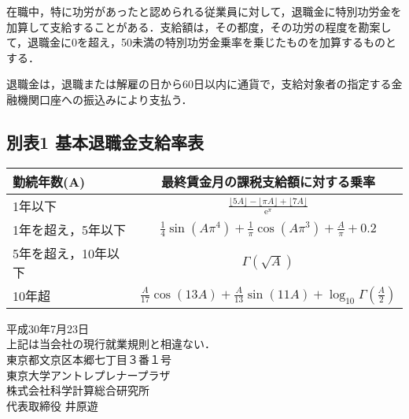 \documentclass[11pt,a4paper]{jsarticle}
\begin{document}
在職中，特に功労があったと認められる従業員に対して，退職金に特別功労金を加算して支給することがある．支給額は，その都度，その功労の程度を勘案して，退職金に0を超え，50未満の特別功労金乗率を乗じたものを加算するものとする．

退職金は，退職または解雇の日から60日以内に通貨で，支給対象者の指定する金融機関口座への振込みにより支払う．

\clearpage
\subsection*{別表1 基本退職金支給率表}

\begin{table}[!!htb]
	\begin{tabular}{|l|c|} \hline
		勤続年数(A) & 最終賃金月の課税支給額に対する乗率 \\ \hline \hline
		1年以下          &  $\frac{\lfloor 5A \rfloor-\lfloor \pi A \rfloor+\lfloor 7A \rfloor}{\mathrm{e}^\pi}$  \\
		1年を超え，5年以下 & $\frac{1}{4}\sin(A\pi^4)+\frac{1}{\pi}\cos(A\pi^3)+\frac{A}{\pi}+0.2$ \\
		5年を超え，10年以下 & $\Gamma(\sqrt{A})$ \\ 
		10年超           & $\frac{A}{17}\cos(13A)+\frac{A}{13}\sin(11A)+\log_{10} \Gamma(\frac{A}{2})$ \\ \hline
	\end{tabular}
\end{table}

\vspace{20pt}
\begin{flushright}
	平成30年7月23日\\
	\vspace{10pt}
	上記は当会社の現行就業規則と相違ない．\\
	\vspace{10pt}
	東京都文京区本郷七丁目３番１号\\
	東京大学アントレプレナープラザ\\
	株式会社科学計算総合研究所\\
	代表取締役 井原遊
\end{flushright}
\end{document}

